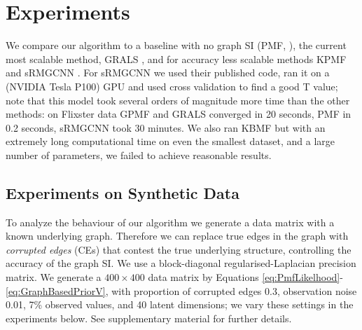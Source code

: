 \documentclass{article}
\theoremstyle{plain}
\theoremstyle{definition}
\theoremstyle{remark}
\begin{document}
\section{Experiments} \label{sec:experiments}
We compare our algorithm to a baseline with no graph SI (PMF, \cite{mnih2008probabilistic}), the current most scalable method, GRALS \cite{rao2015collaborative}, and for accuracy less scalable methods KPMF \cite{zhou2012kernelized} and sRMGCNN \cite{monti2017geometric}. For sRMGCNN we used their published code, ran it on a (NVIDIA Tesla P100) GPU and used cross validation to find a good T value; note that this model took several orders of magnitude more time than the other methods: on Flixster data GPMF and GRALS converged in 20 seconds, PMF in 0.2 seconds, sRMGCNN took 30 minutes. We also ran KBMF \cite{gonen2013kernelized} but with an extremely long computational time on even the smallest dataset, and a large number of parameters, we failed to achieve reasonable results.

\subsection{Experiments on Synthetic Data} \label{sec:synthetic_experiments}
To analyze the behaviour of our algorithm we generate a data matrix with a known underlying graph.
Therefore we can replace true edges in the graph with \textit{corrupted edges} (CEs) that contest the true underlying structure, controlling the accuracy of the graph SI. We use a block-diagonal regularised-Laplacian precision matrix. 
We generate a $400\times 400$ data matrix by Equations \eqref{eq:PmfLikelhood}-\eqref{eq:GraphBasedPriorV}, with proportion of corrupted edges 0.3, observation noise 0.01, 7\% observed values, and 40 latent dimensions;
we vary these settings in the experiments below.
See supplementary material for further 
details. 
\end{document}
